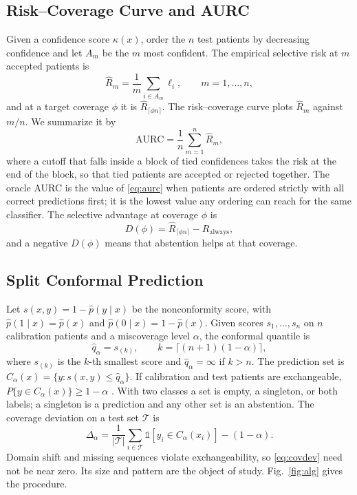 \documentclass[journal]{IEEEtran}
\begin{document}
\subsection{Risk--Coverage Curve and AURC}
Given a confidence score $\kappa(x)$, order the $n$ test patients by decreasing confidence and let $A_m$ be the $m$ most confident. The empirical selective risk at $m$ accepted patients is
\begin{equation}
\hat R_m=\frac{1}{m}\sum_{i\in A_m}\ell_i,\qquad m=1,\dots,n,
\end{equation}
and at a target coverage $\phi$ it is $\hat R_{\lceil\phi n\rceil}$. The risk--coverage curve plots $\hat R_m$ against $m/n$. We summarize it by
\begin{equation}
\mathrm{AURC}=\frac{1}{n}\sum_{m=1}^{n}\hat R_m ,
\label{eq:aurc}
\end{equation}
where a cutoff that falls inside a block of tied confidences takes the risk at the end of the block, so that tied patients are accepted or rejected together. The oracle AURC is the value of \eqref{eq:aurc} when patients are ordered strictly with all correct predictions first; it is the lowest value any ordering can reach for the same classifier. The selective advantage at coverage $\phi$ is
\begin{equation}
D(\phi)=\hat R_{\lceil\phi n\rceil}-R_{\mathrm{always}},
\label{eq:delta}
\end{equation}
and a negative $D(\phi)$ means that abstention helps at that coverage.

\subsection{Split Conformal Prediction}
Let $s(x,y)=1-\hat p(y\mid x)$ be the nonconformity score, with $\hat p(1\mid x)=\hat p(x)$ and $\hat p(0\mid x)=1-\hat p(x)$. Given scores $s_1,\dots,s_n$ on $n$ calibration patients and a miscoverage level $\alpha$, the conformal quantile is
\begin{equation}
\hat q_\alpha=s_{(k)},\qquad k=\lceil (n+1)(1-\alpha)\rceil ,
\label{eq:quantile}
\end{equation}
where $s_{(k)}$ is the $k$-th smallest score and $\hat q_\alpha=\infty$ if $k>n$. The prediction set is $C_\alpha(x)=\{y:s(x,y)\le\hat q_\alpha\}$. If calibration and test patients are exchangeable, $P\{y\in C_\alpha(x)\}\ge1-\alpha$ \cite{vovk2005}. With two classes a set is empty, a singleton, or both labels; a singleton is a prediction and any other set is an abstention. The coverage deviation on a test set $\mathcal{T}$ is
\begin{equation}
\Delta_\alpha=\frac{1}{|\mathcal{T}|}\sum_{i\in\mathcal{T}}\mathbb{1}[y_i\in C_\alpha(x_i)]-(1-\alpha).
\label{eq:covdev}
\end{equation}
Domain shift and missing sequences violate exchangeability, so \eqref{eq:covdev} need not be near zero. Its size and pattern are the object of study. Fig.~\ref{fig:alg} gives the procedure.
\end{document}
